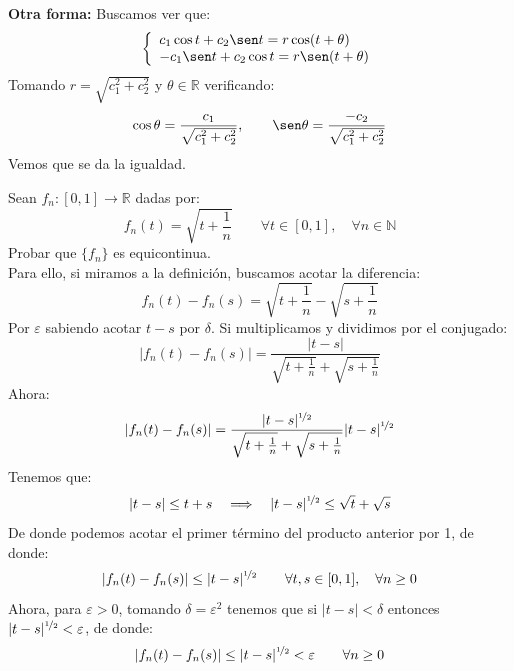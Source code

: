 \begin{ejercicio}
    \noindent
    \textbf{Otra forma:} Buscamos ver que:
    \begin{equation*}
        \left\{\begin{array}{l}
                c_1\cos t + c_2\sen t = r\cos(t+\theta) \\
                -c_1\sen t + c_2\cos t = r\sen(t+\theta)
        \end{array}\right.
    \end{equation*}
    Tomando $r = \sqrt{c_1^2 + c_2^2}$ y $\theta\in \mathbb{R}$ verificando:
    \begin{equation*}
        \cos\theta = \frac{c_1}{\sqrt{c_1^2+c_2^2}}, \qquad \sen\theta = \frac{-c_2}{\sqrt{c_1^2+c_2^2}}
    \end{equation*}
    Vemos que se da la igualdad.
\end{ejercicio}

\begin{ejercicio}
    Sean $f_n:[0,1]\to \mathbb{R}$ dadas por:
    \begin{equation*}
        f_n(t) = \sqrt{t+\frac{1}{n}} \qquad \forall t\in [0,1], \quad \forall n\in \mathbb{N}
    \end{equation*}
    Probar que $\{f_n\}$ es equicontinua.\\

    \noindent
    Para ello, si miramos a la definición, buscamos acotar la diferencia:
    \begin{equation*}
        f_n(t) - f_n(s) = \sqrt{t+\frac{1}{n}} - \sqrt{s+\frac{1}{n}}
    \end{equation*}
    Por $\varepsilon$ sabiendo acotar $t-s$ por $\delta$. Si multiplicamos y dividimos por el conjugado:
    \begin{equation*}
        |f_n(t) - f_n(s)| = \frac{|t-s|}{\sqrt{t+\frac{1}{n}}+\sqrt{s+\frac{1}{n}}}
    \end{equation*}
    Ahora:
    \begin{equation*}
        |f_n(t) - f_n(s)| = \frac{|t-s|^{\nicefrac{1}{2}}}{\sqrt{t+\frac{1}{n}}+\sqrt{s+\frac{1}{n}}}|t-s|^{\nicefrac{1}{2}}
    \end{equation*}
    Tenemos que:
    \begin{equation*}
        |t-s| \leq t+s \quad\Longrightarrow\quad|t-s|^{\nicefrac{1}{2}} \leq \sqrt{t} + \sqrt{s}
    \end{equation*}
    De donde podemos acotar el primer término del producto anterior por 1, de donde:
    \begin{equation*}
        |f_n(t) - f_n(s)| \leq |t-s|^{\nicefrac{1}{2}} \qquad \forall t,s\in [0,1], \quad \forall n\geq 0
    \end{equation*}
    Ahora, para $\varepsilon>0$, tomando $\delta = \varepsilon^2$ tenemos que si $|t-s|<\delta$ entonces $|t-s|^{\nicefrac{1}{2}}<\varepsilon$, de donde:
    \begin{equation*}
        |f_n(t) - f_n(s)| \leq |t-s|^{\nicefrac{1}{2}} < \varepsilon \qquad \forall n\geq 0
    \end{equation*}
\end{ejercicio}

